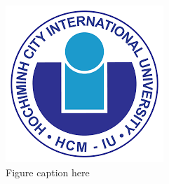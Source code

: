 \begin{figure}[h]
\centering
\includegraphics[scale=0.7]{images/iu.png}
\caption{\label{fig:figure4.1} Figure caption here}
\end{figure}